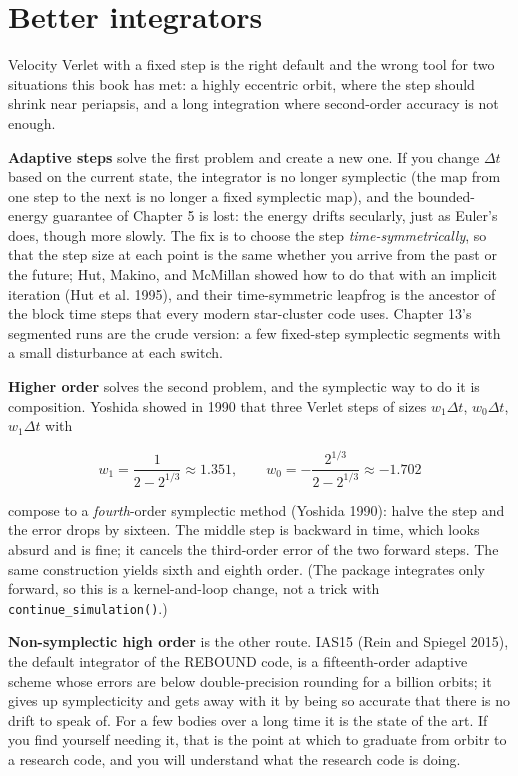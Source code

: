 \documentclass[
  10.5pt,
  letterpaper,
]{scrbook}
\theoremstyle{definition}
\theoremstyle{plain}
\theoremstyle{remark}
\begin{document}
\section{Better integrators}\label{better-integrators}

Velocity Verlet with a fixed step is the right default and the wrong
tool for two situations this book has met: a highly eccentric orbit,
where the step should shrink near periapsis, and a long integration
where second-order accuracy is not enough.

\textbf{Adaptive steps} solve the first problem and create a new one. If
you change \(\Delta t\) based on the current state, the integrator is no
longer symplectic (the map from one step to the next is no longer a
fixed symplectic map), and the bounded-energy guarantee of Chapter 5 is
lost: the energy drifts secularly, just as Euler's does, though more
slowly. The fix is to choose the step \emph{time-symmetrically}, so that
the step size at each point is the same whether you arrive from the past
or the future; Hut, Makino, and McMillan showed how to do that with an
implicit iteration (Hut et al. 1995), and their time-symmetric leapfrog
is the ancestor of the block time steps that every modern star-cluster
code uses. Chapter 13's segmented runs are the crude version: a few
fixed-step symplectic segments with a small disturbance at each switch.

\textbf{Higher order} solves the second problem, and the symplectic way
to do it is composition. Yoshida showed in 1990 that three Verlet steps
of sizes \(w_1\Delta t\), \(w_0\Delta t\), \(w_1\Delta t\) with

\[
w_1 = \frac{1}{2 - 2^{1/3}} \approx 1.351, \qquad w_0 = -\frac{2^{1/3}}{2 - 2^{1/3}} \approx -1.702
\]

compose to a \emph{fourth}-order symplectic method (Yoshida 1990): halve
the step and the error drops by sixteen. The middle step is backward in
time, which looks absurd and is fine; it cancels the third-order error
of the two forward steps. The same construction yields sixth and eighth
order. (The package integrates only forward, so this is a
kernel-and-loop change, not a trick with
\texttt{continue\_simulation()}.)

\textbf{Non-symplectic high order} is the other route. IAS15 (Rein and
Spiegel 2015), the default integrator of the REBOUND code, is a
fifteenth-order adaptive scheme whose errors are below double-precision
rounding for a billion orbits; it gives up symplecticity and gets away
with it by being so accurate that there is no drift to speak of. For a
few bodies over a long time it is the state of the art. If you find
yourself needing it, that is the point at which to graduate from orbitr
to a research code, and you will understand what the research code is
doing.
\end{document}
